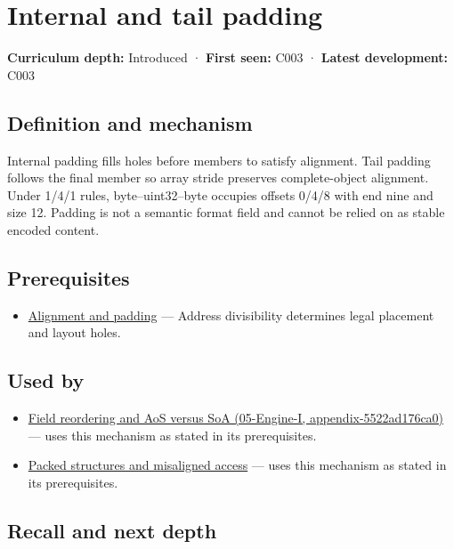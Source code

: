 \hypertarget{appendix-f52f8c5a3afd}{}
\section{Internal and tail padding}\label{appendix-f52f8c5a3afd-internal-and-tail-padding}

\textbf{Curriculum depth:} Introduced · \textbf{First seen:} C003 · \textbf{Latest development:} C003

\subsection{Definition and mechanism}\label{appendix-f52f8c5a3afd-definition-and-mechanism}

Internal padding fills holes before members to satisfy alignment. Tail padding follows the final member so array stride preserves complete-object alignment. Under 1/4/1 rules, byte--uint32--byte occupies offsets 0/4/8 with end nine and size 12. Padding is not a semantic format field and cannot be relied on as stable encoded content.

\subsection{Prerequisites}\label{appendix-f52f8c5a3afd-prerequisites}

\begin{itemize}
\tightlist
\item
  \hyperref[appendix-a1f7c53b4742]{Alignment and padding} --- Address divisibility determines legal placement and layout holes.
\end{itemize}

\subsection{Used by}\label{appendix-f52f8c5a3afd-used-by}

\begin{itemize}
\tightlist
\item
  \href{../05-Engine-I/main.pdf\#nameddest=appendix-5522ad176ca0}{Field reordering and AoS versus SoA (05-Engine-I, appendix-5522ad176ca0)} --- uses this mechanism as stated in its prerequisites.
\item
  \hyperref[appendix-0682dbfc5f0e]{Packed structures and misaligned access} --- uses this mechanism as stated in its prerequisites.
\end{itemize}

\subsection{Recall and next depth}\label{appendix-f52f8c5a3afd-recall-and-next-depth}

